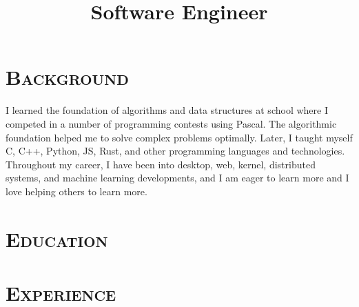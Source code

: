 \documentclass[11pt,a4paper,sans]{moderncv}   %
\title{Software Engineer}               %
\begin{document}
\maketitle
\vspace*{-2em}

\section{\textsc{Background}}

I learned the foundation of algorithms and data structures at school where I
competed in a number of programming contests using Pascal. The algorithmic
foundation helped me to solve complex problems optimally. Later, I taught myself
C, C++, Python, JS, Rust, and other programming languages and technologies.
Throughout my career, I have been into desktop, web, kernel, distributed
systems, and machine learning developments, and I am eager to learn more and I
love helping others to learn more.

\vspace*{1em}
\section{\textsc{Education}}

\vspace*{1em}
\section{\textsc{Experience}}

\end{document}
